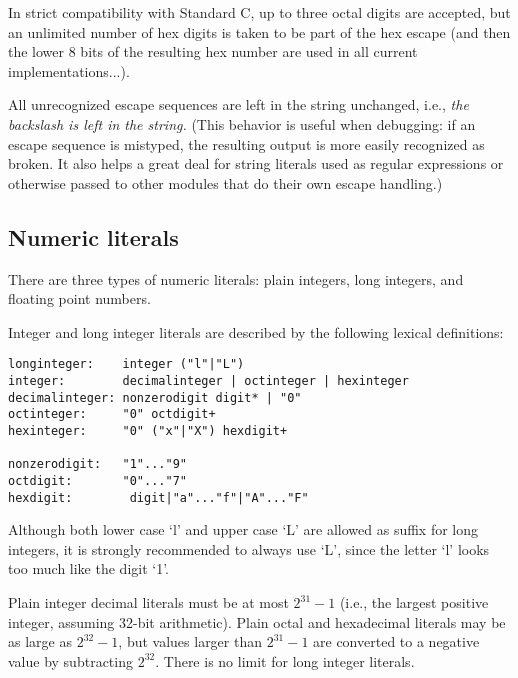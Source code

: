 In strict compatibility with Standard C, up to three octal digits are
accepted, but an unlimited number of hex digits is taken to be part of
the hex escape (and then the lower 8 bits of the resulting hex number
are used in all current implementations...).

All unrecognized escape sequences are left in the string unchanged,
i.e., {\em the backslash is left in the string.}  (This behavior is
useful when debugging: if an escape sequence is mistyped, the
resulting output is more easily recognized as broken.  It also helps a
great deal for string literals used as regular expressions or
otherwise passed to other modules that do their own escape handling.)

\subsection{Numeric literals}

There are three types of numeric literals: plain integers, long
integers, and floating point numbers.

Integer and long integer literals are described by the following
lexical definitions:

\begin{verbatim}
longinteger:    integer ("l"|"L")
integer:        decimalinteger | octinteger | hexinteger
decimalinteger: nonzerodigit digit* | "0"
octinteger:     "0" octdigit+
hexinteger:     "0" ("x"|"X") hexdigit+

nonzerodigit:   "1"..."9"
octdigit:       "0"..."7"
hexdigit:        digit|"a"..."f"|"A"..."F"
\end{verbatim}

Although both lower case `l' and upper case `L' are allowed as suffix
for long integers, it is strongly recommended to always use `L', since
the letter `l' looks too much like the digit `1'.

Plain integer decimal literals must be at most $2^{31} - 1$ (i.e., the
largest positive integer, assuming 32-bit arithmetic).  Plain octal and
hexadecimal literals may be as large as $2^{32} - 1$, but values
larger than $2^{31} - 1$ are converted to a negative value by
subtracting $2^{32}$.  There is no limit for long integer literals.

